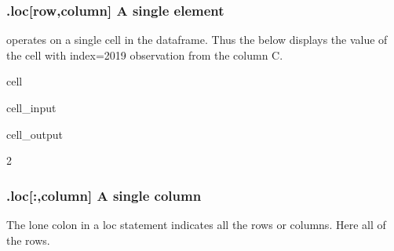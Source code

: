\documentclass[letterpaper,10pt,english]{jupyterBook}
\begin{document}
\subsubsection{.loc{[}row,column{]} A single element}
\label{\detokenize{content/04_PythonEssentials/PythonPackagesEtc:loc-row-column-a-single-element}}
\sphinxAtStartPar
{} operates on a single cell in the dataframe.  Thus the below displays the value of the cell with index=2019 observation from the  column C.

\begin{sphinxuseclass}{cell}\begin{sphinxVerbatimInput}

\begin{sphinxuseclass}{cell_input}
\begin{sphinxVerbatim}[commandchars=\\\{\}]
\PYG{p}{[}\PYG{p}{]}
\end{sphinxVerbatim}

\end{sphinxuseclass}\end{sphinxVerbatimInput}
\begin{sphinxVerbatimOutput}

\begin{sphinxuseclass}{cell_output}
\begin{sphinxVerbatim}[commandchars=\\\{\}]
2
\end{sphinxVerbatim}

\end{sphinxuseclass}\end{sphinxVerbatimOutput}

\end{sphinxuseclass}

\subsubsection{.loc{[}:,column{]} A single column}
\label{\detokenize{content/04_PythonEssentials/PythonPackagesEtc:loc-column-a-single-column}}
\sphinxAtStartPar
The lone colon in a loc statement indicates all the rows or columns.  Here all of the rows.
\end{document}
